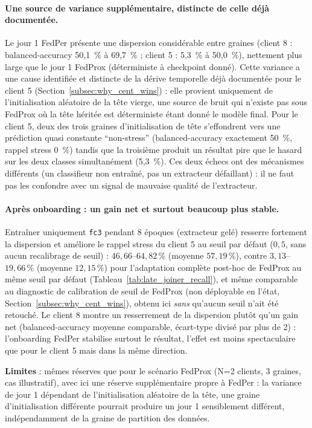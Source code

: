 \documentclass{article}
\begin{document}
\paragraph{Une source de variance supplémentaire, distincte de celle déjà documentée.}
Le jour 1 FedPer présente une dispersion considérable entre graines (client 8 :
balanced-accuracy 50,1~\% à 69,7~\% ; client 5 : 5,3~\% à 50,0~\%), nettement plus large
que le jour 1 FedProx (déterministe à checkpoint donné). Cette variance a une cause
identifiée et distincte de la dérive temporelle déjà documentée pour le client 5
(Section~\ref{subsec:why_cent_wins}) : elle provient uniquement de l'initialisation
aléatoire de la tête vierge, une source de bruit qui n'existe pas sous FedProx où la
tête héritée est déterministe étant donné le modèle final. Pour le client 5, deux des
trois graines d'initialisation de tête s'effondrent vers une prédiction quasi constante
``non-stress'' (balanced-accuracy exactement 50~\%, rappel stress 0~\%) tandis que la
troisième produit un résultat pire que le hasard sur les deux classes simultanément
(5,3~\%). Ces deux échecs ont des mécanismes différents (un classifieur non entraîné,
pas un extracteur défaillant) : il ne faut pas les confondre avec un signal de mauvaise
qualité de l'extracteur.

\paragraph{Après onboarding : un gain net et surtout beaucoup plus stable.} Entraîner
uniquement \texttt{fc3} pendant 8 époques (extracteur gelé) resserre fortement la
dispersion et améliore le rappel stress du client 5 au seuil par défaut ($0{,}5$, sans
aucun recalibrage de seuil) : $46{,}66$--$64{,}82\,\%$ (moyenne $57{,}19\,\%$), contre
$3{,}13$--$19{,}66\,\%$ (moyenne $12{,}15\,\%$) pour l'adaptation complète post-hoc de
FedProx au même seuil par défaut (Tableau~\ref{tab:late_joiner_recall}), et même
comparable au diagnostic de calibration de seuil de FedProx (non déployable en l'état,
Section~\ref{subsec:why_cent_wins}), obtenu ici \emph{sans} qu'aucun seuil n'ait été
retouché. Le client 8 montre un resserrement de la dispersion plutôt qu'un gain net
(balanced-accuracy moyenne comparable, écart-type divisé par plus de 2) : l'onboarding
FedPer stabilise surtout le résultat, l'effet est moins spectaculaire que pour le
client 5 mais dans la même direction.

\textbf{Limites} : mêmes réserves que pour le scénario FedProx (N=2 clients, 3 graines,
cas illustratif), avec ici une réserve supplémentaire propre à FedPer : la variance de
jour 1 dépendant de l'initialisation aléatoire de la tête, une graine d'initialisation
différente pourrait produire un jour 1 sensiblement différent, indépendamment de la
graine de partition des données.
\end{document}
